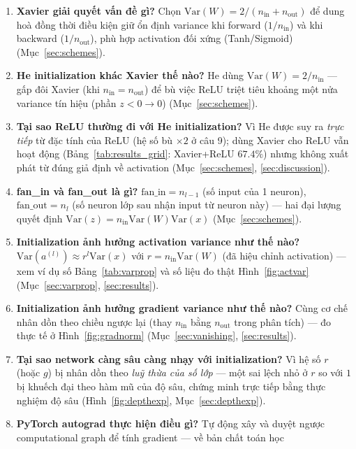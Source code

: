 \documentclass[12pt,a4paper]{article}
\begin{document}
\begin{enumerate}
  (còn phải scale đúng theo $n_{\text{in}}$, xem câu 8--10) (Mục~\ref{sec:random}).
\item \textbf{Xavier giải quyết vấn đề gì?} Chọn $\mathrm{Var}(W)=2/(n_{\text{in}}+n_{\text{out}})$
  để dung hoà đồng thời điều kiện giữ ổn định variance khi forward
  ($1/n_{\text{in}}$) và khi backward ($1/n_{\text{out}}$), phù hợp
  activation đối xứng (Tanh/Sigmoid) (Mục~\ref{sec:schemes}).
\item \textbf{He initialization khác Xavier thế nào?} He dùng
  $\mathrm{Var}(W)=2/n_{\text{in}}$ --- gấp đôi Xavier (khi
  $n_{\text{in}}{=}n_{\text{out}}$) để bù việc ReLU triệt tiêu khoảng một
  nửa variance tín hiệu (phần $z<0\to0$) (Mục~\ref{sec:schemes}).
\item \textbf{Tại sao ReLU thường đi với He initialization?} Vì He được
  suy ra \emph{trực tiếp} từ đặc tính của ReLU (hệ số bù $\times2$ ở câu
  9); dùng Xavier cho ReLU vẫn hoạt động (Bảng~\ref{tab:results_grid}: Xavier+ReLU
  $67.4\%$) nhưng không xuất phát từ đúng giả định về activation
  (Mục~\ref{sec:schemes}, \ref{sec:discussion}).
\item \textbf{fan\_in và fan\_out là gì?} $\mathrm{fan\_in}=n_{l-1}$ (số
  input của 1 neuron), $\mathrm{fan\_out}=n_l$ (số neuron lớp sau nhận
  input từ neuron này) --- hai đại lượng quyết định
  $\mathrm{Var}(z)=n_{\text{in}}\mathrm{Var}(W)\mathrm{Var}(x)$ (Mục~\ref{sec:schemes}).
\item \textbf{Initialization ảnh hưởng activation variance như thế nào?}
  $\mathrm{Var}(a^{(l)})\approx r^l\mathrm{Var}(x)$ với
  $r=n_{\text{in}}\mathrm{Var}(W)$ (đã hiệu chỉnh activation) --- xem ví
  dụ số Bảng~\ref{tab:varprop} và số liệu đo thật Hình~\ref{fig:actvar}
  (Mục~\ref{sec:varprop}, \ref{sec:results}).
\item \textbf{Initialization ảnh hưởng gradient variance như thế nào?}
  Cùng cơ chế nhân dồn theo chiều ngược lại (thay $n_{\text{in}}$ bằng
  $n_{\text{out}}$ trong phân tích) --- đo thực tế ở Hình~\ref{fig:gradnorm}
  (Mục~\ref{sec:vanishing}, \ref{sec:results}).
\item \textbf{Tại sao network càng sâu càng nhạy với initialization?} Vì
  hệ số $r$ (hoặc $g$) bị nhân dồn theo \emph{luỹ thừa của số lớp} --- một
  sai lệch nhỏ ở $r$ so với $1$ bị khuếch đại theo hàm mũ của độ sâu,
  chứng minh trực tiếp bằng thực nghiệm độ sâu (Hình~\ref{fig:depthexp},
  Mục~\ref{sec:depthexp}).
\item \textbf{PyTorch autograd thực hiện điều gì?} Tự động xây và duyệt
  ngược computational graph để tính gradient --- về bản chất toán học

\end{enumerate}
\end{document}
